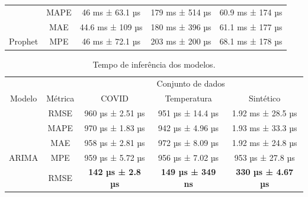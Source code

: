 \begin{table}[htbp]
\begin{tabular}{@{}ccccc@{}}
                                  & MAPE                      & \multicolumn{1}{c}{46 ms ± 63.1 µs}            & \multicolumn{1}{c}{179 ms ± 514 µs}           & 60.9 ms ± 174 µs          \\
                                  & MAE                       & \multicolumn{1}{c}{44.6 ms ± 109 µs}           & \multicolumn{1}{c}{180 ms ± 396 µs}           & 61.1 ms ± 177 µs          \\
        \multirow{-4}{*}{Prophet} & MPE                       & \multicolumn{1}{c}{46 ms ± 72.1 µs}            & \multicolumn{1}{c}{203 ms ± 200 µs}           & 68.1 ms ± 178 µs          \\ \bottomrule
    \end{tabular}
\end{table}

\begin{table}[htbp]
    \caption{Tempo de inferência dos modelos.}\label{tab:tempo_inferencia}
    \centering
    \begin{tabular}{@{}ccccc@{}} \toprule
                                  &                           & \multicolumn{3}{c}{Conjunto de dados}                                                                                       \\ \cmidrule{3-5}
        \multirow{-2}{*}{Modelo}  & \multirow{-2}{*}{Métrica} & \multicolumn{1}{c}{COVID}                      & \multicolumn{1}{c}{Temperatura}               & Sintético                 \\ \midrule
                                  & RMSE                      & \multicolumn{1}{c}{960 µs ± 2.51 µs}           & \multicolumn{1}{c}{951 µs ± 14.4 µs}          & 1.92 ms ± 28.5 µs         \\
                                  & MAPE                      & \multicolumn{1}{c}{970 µs ± 1.83 µs}           & \multicolumn{1}{c}{942 µs ± 4.96 µs}          & 1.93 ms ± 33.3 µs         \\
                                  & MAE                       & \multicolumn{1}{c}{958 µs ± 2.81 µs}           & \multicolumn{1}{c}{972 µs ± 8.09 µs}          & 1.92 ms ± 24.8 µs         \\
        \multirow{-4}{*}{ARIMA}   & MPE                       & \multicolumn{1}{c}{959 µs ± 5.72 µs}           & \multicolumn{1}{c}{956 µs ± 7.02 µs}          & 953 µs ± 27.8 µs          \\ \midrule
                                  & RMSE                      & \multicolumn{1}{c}{\textbf{142 µs ± 2.8 µs}}   & \multicolumn{1}{c}{\textbf{149 µs ± 349 ns}}  & \textbf{330 µs ± 4.67 µs} \\

\end{tabular}
\end{table}
